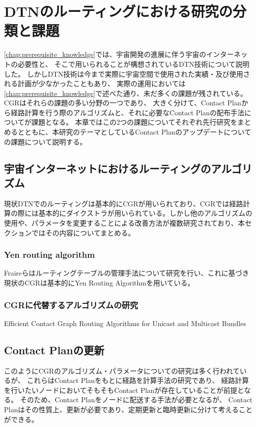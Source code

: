 \chapter{DTNのルーティングにおける研究の分類と課題}

\label{chap:related_works}
\ref{chap:prerequisite_knowledge}では、宇宙開発の進展に伴う宇宙のインターネットの必要性と、
そこで用いられることが構想されているDTN技術について説明した。
しかしDTN技術は今まで実際に宇宙空間で使用された実績・及び使用される計画が少なかったこともあり、
実際の運用においては\ref{chap:prerequisite_knowledge}で述べた通り、未だ多くの課題が残されている。CGRはそれらの課題の多い分野の一つであり、
大きく分けて、Contact Planから経路計算を行う際のアルゴリズムと、それに必要なContact Planの配布手法についてが課題となる。
本章ではこの2つの課題についてそれぞれ先行研究をまとめるとともに、本研究のテーマとしているContact Planのアップデートについての課題について説明する。

\section{宇宙インターネットにおけるルーティングのアルゴリズム}
\label{sec:宇宙インターネットにおけるルーティングのアルゴリズム}    
現状DTNでのルーティングは基本的にCGRが用いられており、CGRでは経路計算の際には基本的にダイクストラが用いられている。しかし他のアルゴリズムの使用や、パラメータを変更することによる改善方法が複数研究されており、本セクションではその内容についてまとめる。
\subsection{Yen routing algorithm}
\label{sec:Yen routing algorithm}
Fraireらはルーティングテーブルの管理手法について研究を行い、これに基づき現状のCGRは基本的にYen Routing Algorithmを用いている。\cite{FRAIRE2018}

\subsection{CGRに代替するアルゴリズムの研究}
\label{sec:CGRに代替するアルゴリズムの研究}
Efficient Contact Graph Routing Algorithms for Unicast and Multicast Bundles
\cite{DeJonckere2019}


\section{Contact Planの更新}
\label{sec:ContactPlanの更新}
このようにCGRのアルゴリズム・パラメータについての研究は多く行われているが、
これらはContact Planをもとに経路を計算手法の研究であり、
経路計算を行いたいノードにおいてそもそもContact Planが存在していることが前提となる。
そのため、Contact Planをノードに配送する手法が必要となるが、
Contact Planはその性質上、更新が必要であり、定期更新と臨時更新に分けて考えることができる。


